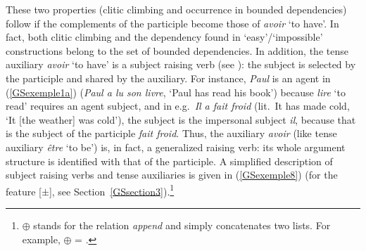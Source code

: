 	\label{GSexemple7c}
\zl

\largerpage[2]
\noindent
These two properties (clitic climbing and occurrence in bounded dependencies) follow if the complements of the participle become those of \emph{avoir} `to have'.
In fact, both clitic climbing and the dependency found in `easy'/`impossible' constructions belong to the set of bounded dependencies.
In addition, the tense auxiliary \emph{avoir} `to have' is a subject raising verb (see ): the subject is selected by the participle and shared by the auxiliary. For instance, \emph{Paul} is an agent in (\ref{GSexemple1a}) (\emph{Paul a lu son livre}, `Paul has read his book') because \emph{lire} `to read' requires an agent subject, and in e.g.\ \emph{Il a fait froid} (lit.\ It has made cold, `It [the weather] was cold'), the subject is the impersonal subject \emph{il}, because that is the subject of the participle \emph{fait froid}.
Thus, the auxiliary \emph{avoir} (like tense auxiliary \emph{\^etre} `to be') is, in fact, a
generalized raising verb: its whole argument structure is identified with that of the participle. A
simplified description of subject raising verbs and tense auxiliaries is given in (\ref{GSexemple8})
(for the feature [\light{}$\pm$], see Section~\ref{GSsection3}).\footnote{
  $\oplus$ stands for the relation \emph{append} and simply concatenates two lists. For
    example,  $\oplus$  = .
}

\begin{exe}
	\ex 	\label{GSexemple8}
	\begin{xlist}
	
	\end{xlist}
\end{exe}

